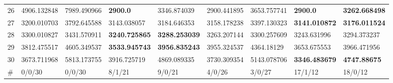 \begin{table*}[t]
\begin{tabular}{|p{0.8cm}|p{1.6cm}|p{1.6cm}|p{1.6cm}|p{1.6cm}|p{1.6cm}|p{1.6cm}|p{1.6cm}|p{1.6cm}|}
26  & 4906.132848 & 7989.490966 & \textbf{2900.0} & 3346.874039 & 2900.441895 & 3653.757741 & \textbf{2900.0} & \textbf{3262.668498} \\ 
27  & 3200.010703 & 3792.645588 & 3143.038057 & 3184.646353 & 3158.178238 & 3397.130323 & \textbf{3141.010872} & \textbf{3176.011524} \\ 
28  & 3300.010827 & 3431.570911 & \textbf{3240.725865} & \textbf{3288.253039} & 3263.207144 & 3300.257609 & 3243.631996 & 3294.373237 \\ 
29  & 3812.475517 & 4605.349537 & \textbf{3533.945743} & \textbf{3956.835243} & 3955.324537 & 4364.18129 & 3653.675553 & 3966.471956 \\ 
30  & 3673.711968 & 5813.173755 & 3916.725719 & 4869.089335 & 3730.309354 & 5143.078706 & \textbf{3346.483679} & \textbf{4747.88675} \\ 
\hline
\#  & 0/0/30 & 0/0/30 & 8/1/21 & 9/0/21 & 4/0/26 & 3/0/27 & 17/1/12 & 18/0/12 \\
\hline

\end{tabular}
\end{table*}

